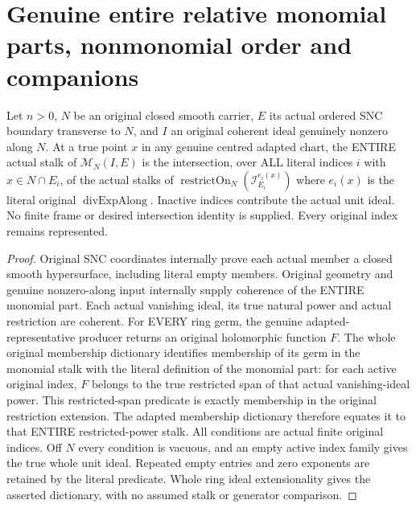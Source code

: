 \section{Genuine entire relative monomial parts, nonmonomial order and companions}

\begin{theorem}
\label{hir:submersion-relative-parts-actual-stalk-dictionary}
\leanok
Let $n>0$, $N$ be an original closed smooth carrier, $E$ its actual ordered
SNC boundary transverse to $N$, and $I$ an original coherent ideal genuinely
nonzero along $N$. At a true point $x$ in any genuine centred adapted chart,
the ENTIRE actual stalk of $\mathcal M_N(I,E)$ is the intersection, over
ALL literal indices $i$ with $x\in N\cap E_i$, of the actual stalks of
$\operatorname{restrictOn}_N(\mathcal I_{E_i}^{e_i(x)})$ where
$e_i(x)$ is the literal original $\operatorname{divExpAlong}$. Inactive indices
contribute the actual unit ideal. No finite frame or desired intersection
identity is supplied. Every original index remains represented.
\end{theorem}
\begin{proof}
Original SNC coordinates internally prove each actual member a closed smooth
hypersurface, including literal empty members. Original geometry and genuine
nonzero-along input internally supply coherence of the ENTIRE monomial part.
Each actual vanishing ideal, its true natural power and actual restriction
are coherent. For EVERY ring germ, the genuine adapted-representative
producer returns an original holomorphic function $F$. The whole original
membership dictionary identifies membership of its germ in the monomial
stalk with the literal definition of the monomial part: for each active
original index, $F$ belongs to the true restricted span of that actual
vanishing-ideal power. This restricted-span predicate is exactly membership
in the original restriction extension. The adapted membership dictionary
therefore equates it to that ENTIRE restricted-power stalk. All conditions
are actual finite original indices. Off $N$ every condition is vacuous,
and an empty active index family gives the true whole unit ideal. Repeated
empty entries and zero exponents are retained by the literal predicate.
Whole ring ideal extensionality gives the asserted dictionary, with no
assumed stalk or generator comparison.
\end{proof}

